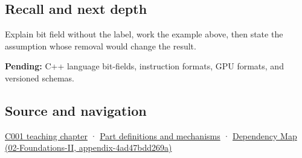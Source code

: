 \subsection{Recall and next depth}\label{recall-and-next-depth}

Explain bit field without the label, work the example above, then state the assumption whose removal would change the result.

\textbf{Pending:} C++ language bit-fields, instruction formats, GPU formats, and versioned schemas.

\subsection{Source and navigation}\label{source-and-navigation}

\href{Continuous\%20Notes/Computing\%20Foundations\%20-\%20From\%20Bits\%20to\%20C++\%20and\%20Systems\%20APIs\#From\%20a\%20signal\%20to\%20an\%20interpretation}{C001 teaching chapter} · \hyperref[appendix-fd090d982a15]{Part definitions and mechanisms} · \href{}{Dependency Map (02-Foundations-II, appendix-4ad47bdd269a)}
